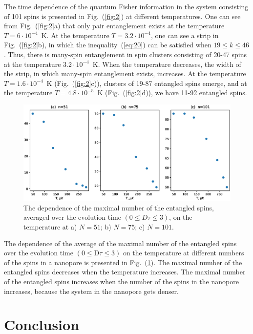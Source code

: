 \documentclass[review]{elsarticle}
\begin{document}
The time dependence of the quantum Fisher information in the system consisting of 101 spins is presented in Fig.~(\ref{fig:2}) at different temperatures. 
One can see from Fig.~(\ref{fig:2}a) that only pair entanglement exists at the temperature $T=6\cdot10^{-4}$~K.
At the temperature $T=3.2\cdot10^{-4}$, one can see a strip in Fig.~(\ref{fig:2}b), in which the inequality~(\ref{eq:20}) can be satisfied when $19 \leq k \leq 46$.
Thus, there is many-spin entanglement in spin clusters consisting of 20-47 spins at the temperature $3.2\cdot10^{-4}$~K.
When the temperature decreases, the width of the strip, in which many-spin entanglement exists, increases. 
At the temperature $T=1.6\cdot10^{-4}$~K (Fig.~(\ref{fig:2}c)), clusters of 19-87 entangled spins emerge, and at the temperature $T=4.8\cdot10^{-5}$~K (Fig.~(\ref{fig:2}d)), we have 11-92 entangled spins.

\begin{figure}
  	\includegraphics[width=0.95\linewidth]{entangled_spins_by_n.eps}
	\caption{
	    The dependence of the maximal number of the entangled spins,
	    averaged over the evolution time $(0 \leq D\tau \leq 3)$, 
	    on the temperature at a) $N=51$; b) $N=75$; c) $N=101$.
	}
	\label{fig:3}
\end{figure}

The dependence of the average of the maximal number of the entangled spins over the evolution time $({0}\leq \mathrm{D}\tau\leq{3})$ on the temperature at different numbers of the spins in a nanopore is presented in Fig.~(\ref{fig:3}).
The maximal number of the entangled spins decreases when the temperature increases. 
The maximal number of the entangled spins increases when the number of the spins in the nanopore increases, because the system in the nanopore gets denser. 



\section{Conclusion}
\label{sec:6}
\end{document}
